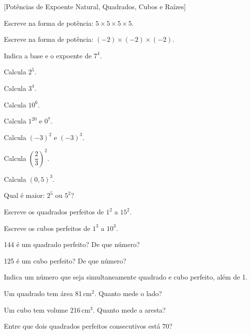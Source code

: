 \documentclass[12pt]{article}
\begin{document}
[Potências de Expoente Natural, Quadrados, Cubos e Raízes]


\begin{exercicios}
  \item Escreve na forma de potência: $5 \times 5 \times 5 \times 5$.
  \item Escreve na forma de potência: $(-2) \times (-2) \times (-2)$.
  \item Indica a base e o expoente de $7^4$.
  \item Calcula $2^5$.
  \item Calcula $3^4$.
  \item Calcula $10^6$.
  \item Calcula $1^{20}$ e $0^{7}$.
  \item Calcula $(-3)^2$ e $(-3)^3$.
  \item Calcula $\left(\dfrac{2}{3}\right)^2$.
  \item Calcula $(0{,}5)^3$.
  \item Qual é maior: $2^5$ ou $5^2$?
\end{exercicios}

\begin{exercicios}
  \item Escreve os quadrados perfeitos de $1^2$ a $15^2$.
  \item Escreve os cubos perfeitos de $1^3$ a $10^3$.
  \item 144 é um quadrado perfeito? De que número?
  \item 125 é um cubo perfeito? De que número?
  \item Indica um número que seja simultaneamente quadrado e cubo perfeito, além de 1.
  \item Um quadrado tem área 81\,cm$^2$. Quanto mede o lado?
  \item Um cubo tem volume 216\,cm$^3$. Quanto mede a aresta?
  \item Entre que dois quadrados perfeitos consecutivos está 70?
\end{exercicios}
\end{document}
